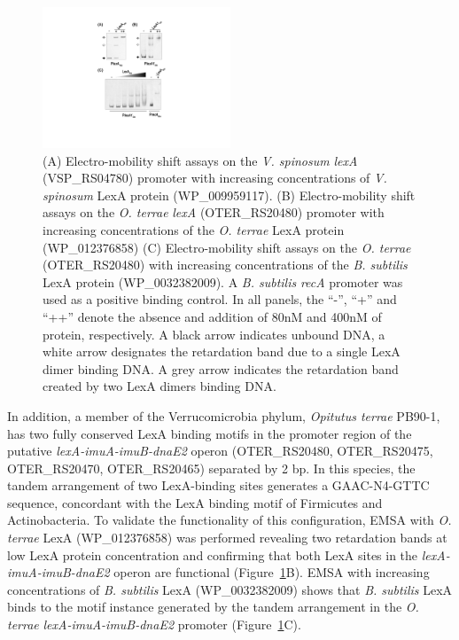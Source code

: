 \begin{figure}
  \centering
  \includegraphics[width=0.5\textwidth]{figures/chapter5/emsa1}
  \caption{(A) Electro-mobility shift assays on the \textit{V. spinosum}
    \textit{lexA} (VSP\_RS04780) promoter with increasing concentrations of
    \textit{V. spinosum} LexA protein (WP\_009959117). (B) Electro-mobility
    shift assays on the \textit{O. terrae} \textit{lexA} (OTER\_RS20480)
    promoter with increasing concentrations of the \textit{O. terrae} LexA
    protein (WP\_012376858) (C) Electro-mobility shift assays on the
    \textit{O. terrae} (OTER\_RS20480) with increasing concentrations of the
    \textit{B. subtilis} LexA protein (WP\_0032382009). A \textit{B. subtilis}
    \textit{recA} promoter was used as a positive binding control.  In all
    panels, the ``-'', ``+'' and ``++'' denote the absence and addition of 80nM
    and 400nM of protein, respectively. A black arrow indicates unbound DNA, a
    white arrow designates the retardation band due to a single LexA dimer
    binding DNA\@. A grey arrow indicates the retardation band created by two
    LexA dimers binding DNA.}
  \label{fig:emsa1}
\end{figure}


In addition, a member of the Verrucomicrobia phylum, \textit{Opitutus terrae}
PB90-1, has two fully conserved LexA binding motifs in the promoter region of
the putative \textit{lexA-imuA-imuB-dnaE2} operon (OTER\_RS20480,
OTER\_RS20475, OTER\_RS20470, OTER\_RS20465) separated by 2 bp. In this
species, the tandem
arrangement of two LexA-binding sites generates a GAAC-N4-GTTC sequence,
concordant with the LexA binding motif of Firmicutes and Actinobacteria. To
validate the
functionality of this configuration, EMSA with \textit{O. terrae} LexA
(WP\_012376858) was performed revealing two retardation bands at low LexA
protein concentration and confirming that both LexA sites in the
\textit{lexA-imuA-imuB-dnaE2} operon are functional
(Figure~\ref{fig:emsa1}B). EMSA with increasing concentrations of
\textit{B. subtilis} LexA (WP\_0032382009) shows that \textit{B. subtilis} LexA
binds to the motif instance generated by the tandem arrangement in the
\textit{O. terrae} \textit{lexA-imuA-imuB-dnaE2} promoter (Figure~\ref{fig:emsa1}C).

